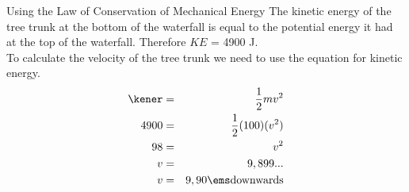 \begin{wex}{Using the Law of Conservation of Mechanical Energy}
{
The kinetic energy of the tree trunk at the bottom of the waterfall is equal to the potential energy it had at the top of the waterfall. Therefore $KE$ = 4900 J.\\

To calculate the velocity of the tree trunk we need to use the equation for kinetic energy.
\begin{eqnarray*}
\kener & = & \frac{1}{2}mv^2 \\
4900 &=& \frac{1}{2} (100) (v^2) \\
98 &=& v^2\\
v &=& 9,899...\\
v &=& 9,90 \ems \rm{downwards}
\end{eqnarray*}}
\end{wex}
    \noindent
\par
            \label{m38786*secfhsst!!!underscore!!!id2130}\vspace{.5cm} 
      \noindent
